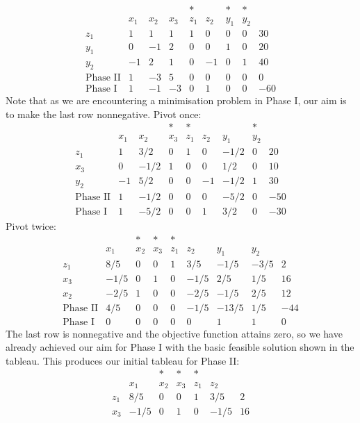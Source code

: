 \begin{example}
$$\begin{array}{c|ccccccc|c}
        &&&&\ast&&\ast&\ast&\\
        &x_1&x_2&x_3&z_1&z_2&y_1&y_2&\\ \hline
        z_1&1&1&1&1&0&0&0&30\\
        y_1&0&-1&2&0&0&1&0&20\\
        y_2&-1&2&1&0&-1&0&1&40\\ \hline
        \text{Phase II}&1&-3&5&0&0&0&0&0\\ \hline
        \text{Phase I}&1&-1&-3&0&1&0&0&-60
    \end{array}$$
    Note that as we are encountering a minimisation problem in Phase I, our aim is to make the last row nonnegative.
    Pivot once:
    $$\begin{array}{c|ccccccc|c}
        &&&\ast&\ast&&&\ast&\\
        &x_1&x_2&x_3&z_1&z_2&y_1&y_2&\\ \hline
        z_1&1&3/2&0&1&0&-1/2&0&20\\
        x_3&0&-1/2&1&0&0&1/2&0&10\\
        y_2&-1&5/2&0&0&-1&-1/2&1&30\\ \hline
        \text{Phase II}&1&-1/2&0&0&0&-5/2&0&-50\\ \hline
        \text{Phase I}&1&-5/2&0&0&1&3/2&0&-30
    \end{array}$$
    Pivot twice:
    $$\begin{array}{c|ccccccc|c}
        &&\ast&\ast&\ast&&&&\\
        &x_1&x_2&x_3&z_1&z_2&y_1&y_2&\\ \hline
        z_1&8/5&0&0&1&3/5&-1/5&-3/5&2\\
        x_3&-1/5&0&1&0&-1/5&2/5&1/5&16\\
        x_2&-2/5&1&0&0&-2/5&-1/5&2/5&12\\ \hline
        \text{Phase II}&4/5&0&0&0&-1/5&-13/5&1/5&-44\\ \hline
        \text{Phase I}&0&0&0&0&0&1&1&0
    \end{array}$$
    The last row is nonnegative and the objective function attains zero, so we have already achieved our aim for Phase I with the basic feasible solution shown in the tableau.
    This produces our initial tableau for Phase II:
    $$\begin{array}{c|ccccc|c}
        &&\ast&\ast&\ast&&\\
        &x_1&x_2&x_3&z_1&z_2&\\ \hline
        z_1&8/5&0&0&1&3/5&2\\
        x_3&-1/5&0&1&0&-1/5&16\\

\end{array}$$
\end{example}
